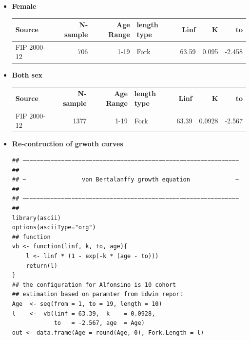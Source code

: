 \documentclass[11pt]{article}
\begin{document}
\begin{itemize}
\begin{itemize}
\begin{itemize}
\end{itemize}
\end{itemize}


\begin{itemize}
\item \textbf{Female}

\begin{center}
\begin{tabular}{lrrlrrr}
 Source       &  N-sample  &  Age Range  &  length type  &   Linf  &      K  &      to  \\
\hline
 FIP 2000-12  &       706  &       1-19  &  Fork         &  63.59  &  0.095  &  -2.458  \\
\end{tabular}
\end{center}


\end{itemize}


\begin{itemize}
\item \textbf{Both sex}


\begin{center}
\begin{tabular}{lrrlrrr}
 Source       &  N-sample  &  Age Range  &  length type  &   Linf  &       K  &      to  \\
\hline
 FIP 2000-12  &      1377  &       1-19  &  Fork         &  63.39  &  0.0928  &  -2.567  \\
\end{tabular}
\end{center}


\item \textbf{Re-contruction of grwoth curves}

\begin{verbatim}
## ~~~~~~~~~~~~~~~~~~~~~~~~~~~~~~~~~~~~~~~~~~~~~~~~~~~~~~~~~~~~~~ ##
## ~                von Bertalanffy growth equation             ~ ##
## ~~~~~~~~~~~~~~~~~~~~~~~~~~~~~~~~~~~~~~~~~~~~~~~~~~~~~~~~~~~~~~ ##
library(ascii)
options(asciiType="org")
## function
vb <- function(linf, k, to, age){
    l <- linf * (1 - exp(-k * (age - to)))
    return(l)
}
## the configuration for Alfonsino is 10 cohort
## estimation based on paramter from Edwin report
Age  <- seq(from = 1, to = 19, length = 10)
l    <-  vb(linf = 63.39,  k    = 0.0928,
            to   = -2.567, age  = Age)
out <- data.frame(Age = round(Age, 0), Fork.Length = l)


\end{verbatim}
\end{itemize}
\end{itemize}
\end{document}
